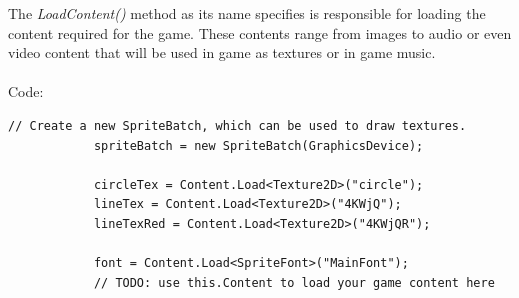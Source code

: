 \documentclass[11pt]{article} %
\begin{document}
The \emph{LoadContent()} method as its name specifies is responsible for loading the content required for the game. These contents range from images to audio or even video content that will be used in game as textures or in game music. 
\\
\\
Code:
\begin{verbatim}
// Create a new SpriteBatch, which can be used to draw textures.
            spriteBatch = new SpriteBatch(GraphicsDevice);

            circleTex = Content.Load<Texture2D>("circle");
            lineTex = Content.Load<Texture2D>("4KWjQ");
            lineTexRed = Content.Load<Texture2D>("4KWjQR");

            font = Content.Load<SpriteFont>("MainFont");
            // TODO: use this.Content to load your game content here
\end{verbatim}
\end{document}
